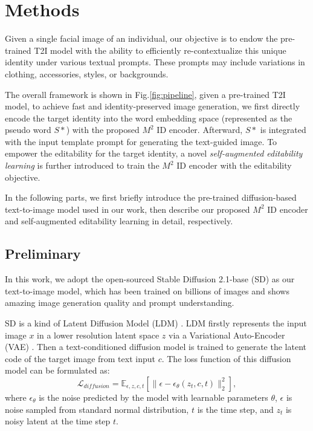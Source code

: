 \section{Methods}\label{sec:methods}

Given a single facial image of an individual, our objective is to endow the pre-trained T2I model with the ability to efficiently re-contextualize this unique identity under various textual prompts. These prompts may include variations in clothing, accessories, styles, or backgrounds.


The overall framework is shown in Fig.\ref{fig:pipeline}, given a pre-trained T2I model, 
to achieve fast and identity-preserved image generation, we first directly encode the target identity into the word embedding  space (represented as the pseudo word $S*$) with the proposed $M^2$ ID encoder. Afterward,
$S*$ is integrated with the input template prompt for 
generating the text-guided image. To empower the editability for the target identity, a novel \emph{self-augmented editability learning} is further introduced to train the $M^2$ ID encoder with the editability objective.


In the following parts, we first briefly introduce the pre-trained diffusion-based text-to-image model used in our work, then describe our proposed  $M^2$ ID encoder and self-augmented editability learning in detail, respectively.

\subsection{Preliminary}
In this work, we adopt the open-sourced Stable Diffusion 2.1-base (SD) as our text-to-image model, which has been trained on billions of images and shows amazing image generation quality and prompt understanding. 

SD is a kind of Latent Diffusion Model (LDM) \cite{rombach2022high}. LDM firstly represents the input image $x$ in a lower resolution latent space $z$ via a Variational Auto-Encoder (VAE) \cite{kingma2013auto}. Then a text-conditioned diffusion model is trained to generate the latent code of the target image from text input $c$. The loss function of this diffusion model can be formulated as:
\begin{equation}
    \mathcal{L}_{diffusion} = \mathbb{E}_{\epsilon,z,c,t}[\lVert{\epsilon - \epsilon_{\theta}(z_t,c,t)}\rVert_2^2],
\end{equation}
where $\epsilon_{\theta}$ is the noise predicted by the model with learnable parameters $\theta$, $\epsilon$ is noise sampled from standard normal distribution, $t$ is the time step, and $z_t$ is noisy latent at the time step $t$.

